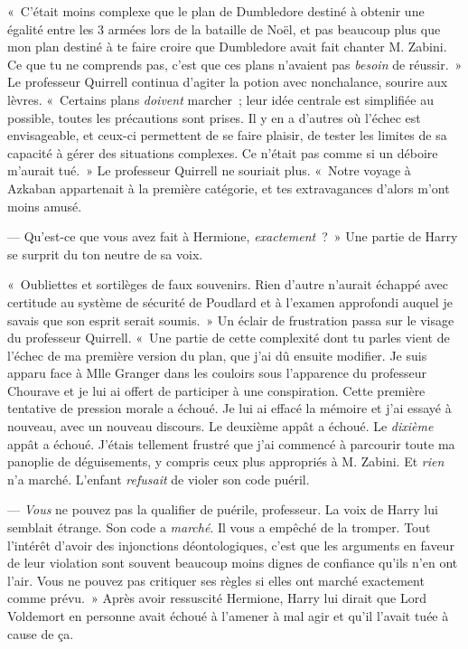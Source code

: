«~C'était moins complexe que le plan de Dumbledore destiné à obtenir une égalité entre les 3 armées lors de la bataille de Noël, et pas beaucoup plus que mon plan destiné à te faire croire que Dumbledore avait fait chanter M. Zabini.
Ce que tu ne comprends pas, c'est que ces plans n'avaient pas \emph{besoin} de réussir.~»
Le professeur Quirrell continua d'agiter la potion avec nonchalance, sourire aux lèvres.
«~Certains plans \emph{doivent} marcher~; leur idée centrale est simplifiée au possible, toutes les précautions sont prises.
Il y en a d'autres où l'échec est envisageable, et ceux-ci permettent de se faire plaisir, de tester les limites de sa capacité à gérer des situations complexes.
Ce n'était pas comme si un déboire m'aurait tué.~»
Le professeur Quirrell ne souriait plus.
«~Notre voyage à Azkaban appartenait à la première catégorie, et tes extravagances d'alors m'ont moins amusé.

--- Qu'est-ce que vous avez fait à Hermione, \emph{exactement}~?~»
Une partie de Harry se surprit du ton neutre de sa voix.

«~Oubliettes et sortilèges de faux souvenirs.
Rien d'autre n'aurait échappé avec certitude au système de sécurité de Poudlard et à l'examen approfondi auquel je savais que son esprit serait soumis.~»
Un éclair de frustration passa sur le visage du professeur Quirrell.
«~Une partie de cette complexité dont tu parles vient de l'échec de ma première version du plan, que j'ai dû ensuite modifier.
Je suis apparu face à Mlle Granger dans les couloirs sous l'apparence du professeur Chourave et je lui ai offert de participer à une conspiration.
Cette première tentative de pression morale a échoué.
Je lui ai effacé la mémoire et j'ai essayé à nouveau, avec un nouveau discours.
Le deuxième appât a échoué.
Le \emph{dixième} appât a échoué.
J'étais tellement frustré que j'ai commencé à parcourir toute ma panoplie de déguisements, y compris ceux plus appropriés à M. Zabini.
Et \emph{rien} n'a marché.
L'enfant \emph{refusait} de violer son code puéril.

--- \emph{Vous} ne pouvez pas la qualifier de puérile, professeur.
La voix de Harry lui semblait étrange.
Son code a \emph{marché}.
Il vous a empêché de la tromper.
Tout l'intérêt d'avoir des injonctions déontologiques, c'est que les arguments en faveur de leur violation sont souvent beaucoup moins dignes de confiance qu'ils n'en ont l'air.
Vous ne pouvez pas critiquer ses règles si elles ont marché exactement comme prévu.~»
Après avoir ressuscité Hermione, Harry lui dirait que Lord Voldemort en personne avait échoué à l'amener à mal agir et qu'il l'avait tuée à cause de ça.


